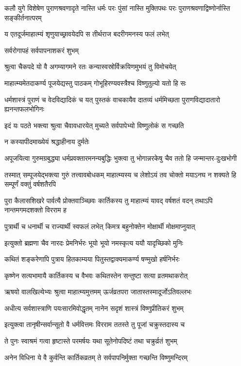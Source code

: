 \threelineshloka
{कलौ युगे विशेषेण पुराणश्रवणादृते}
{नास्ति धर्मः परः पुंसां नास्ति मुक्तिपथः परः}
{पुराणश्रवणाद्विष्णोर्नास्ति सङ्कीर्तनात्परम्} %

\twolineshloka
{य एतदूर्जमाहात्म्यं शृणुयाच्छ्रावयेदपि}
{स तीर्थराज बदरीगमनस्य फलं लभेत्} %


\onelineshloka
{सर्वरोगापहं सर्वपापनाशकरं शुभम्} %

\twolineshloka
{श्रुत्वा चैकपदे यो वै अगम्यागमने रतः}
{कन्यास्वस्रोर्विक्रयिणमुभयं तु विमोचयेत्} %

\twolineshloka
{माहात्म्यमेतदाकर्ण्य पूजयेद्यस्तु पाठकम्}
{गोभूहिरण्यवस्त्रैश्च विष्णुतुल्यो यतो हि सः} %

\threelineshloka
{धर्मशास्त्रं पुराणं च वेदविद्यादिकं च यत्}
{पुस्तकं वाचकायैव दातव्यं धर्ममिच्छता}
{पुराणविद्यादातारो ह्यनन्तफलभोगिनः} %

\twolineshloka
{इदं यः पठते भक्त्या श्रुत्वा चैवावधारयेत्}
{मुच्यते सर्वपापेभ्यो विष्णुलोकं स गच्छति} %


\onelineshloka
{न कस्यापीदमाख्येयं श्रद्धाहीनाय दुर्मतेः} %

\fourlineindentedshloka
{अपूजयित्वा गुरुमग्रबुद्ध्या}
{धर्मप्रवक्तारमनन्यबुद्धिः}
{भुक्त्वा तु भोगान्नरकेषु चैव}
{ततो हि जन्मान्तर-दुःखभोगी} %

\threelineshloka
{तस्मात् सम्पूजयेद्भक्त्या गुरुं तत्त्वावबोधकम्}
{माहात्म्यस्य च लेशोऽयं तव चोक्तो मयाऽनघ} %
{न शक्यते हि सम्पूर्णं वक्तुं वर्षशतैरपि}

\threelineshloka
{पुरा कैलासशिखरे पार्वत्यै प्रोक्तवाञ्च्छिवः} %
{कार्तिकस्य तु माहात्म्यं यावद् वर्षशतं वदन्}
{तथाऽपि नान्तमगमदशक्तो विरराम ह} %

\twolineshloka
{पुत्रार्थी च धनार्थी च राज्यार्थी स्वफलं लभेत्}
{किमत्र बहुनोक्तेन मोक्षार्थी मोक्षमाप्नुयात्} %


\twolineshloka
{इत्युक्तो ब्रह्मणा चैव नारदः प्रेमनिर्भरः}
{भूयो भूयो नमस्कृत्य ययौ यादृच्छिको मुनिः} %

\twolineshloka
{कथितं शङ्करेणापि पुत्राय हितकाम्यया}
{पितुस्तद्वाक्यमाकर्ण्य षण्मुखो हर्षनिर्भरः} %

\twolineshloka
{कृष्णेन सत्यभामायै कार्तिकस्य च वैभवः}
{कथितस्तेन सन्तुष्टा सत्या व्रतमथाकरोत्} %

\twolineshloka
{ऋषयो वालखिल्येभ्यः श्रुत्वा माहात्म्यमुत्तमम्}
{ऊर्जव्रतपरा जातास्तस्मादूर्जोऽतिवल्लभः} %

\twolineshloka
{अधीत्य सर्वशास्त्राणि पयःसारमिवोद्धृतम्}
{नानेन सदृशं शास्त्रं विष्णुप्रीतिकरं शुभम्} %


\twolineshloka
{इत्युक्त्वा तानृषीन्सर्वान्सूतो वै धर्मवित्तमः}
{विरराम ततस्ते तु पूजां चक्रुस्तदास्य च} %

\twolineshloka
{ते पुनः स्वाश्रमं गत्वा हृष्टास्ते परमर्षयः}
{यथा सूतेनोपदिष्टं तथा चक्रुर्व्रतं शुभम्} %

\twolineshloka
{अनेन विधिना ये वै कुर्वन्ति कार्तिकव्रतम्}
{ते सर्वपापनिर्मुक्ता गच्छन्ति विष्णुमन्दिरम्} %



\endgroup
